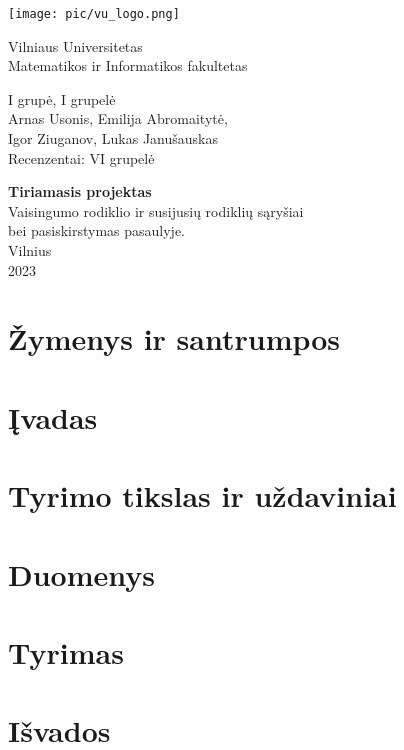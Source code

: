 \documentclass[12pt]{article}
\begin{document}
\begin{titlepage}
    \centering
    \texttt{[image: pic/vu\_logo.png]} \\
    {\Huge
    Vilniaus Universitetas \\
    Matematikos ir Informatikos fakultetas\par} 
    \vspace{2cm}
    
    \Large
    {I grupė, I grupelė \\
    Arnas Usonis, Emilija Abromaitytė, \\ Igor Ziuganov, Lukas Janušauskas \\
    Recenzentai: VI grupelė\par}
    \vspace{1cm}
    {\LARGE
    \textbf{Tiriamasis projektas \\}}
    \vspace{0.2cm}
    {\Large
    Vaisingumo rodiklio ir susijusių rodiklių sąryšiai \\ bei pasiskirstymas pasaulyje. \\}
    \vspace*{\fill}
    Vilnius \\ 2023
    
    
\end{titlepage}
\pagebreak

\normalsize
\tableofcontents
\pagebreak

\section{Žymenys ir santrumpos}


\section{Įvadas}

\pagebreak

\section{Tyrimo tikslas ir uždaviniai}

\pagebreak

\section{Duomenys}

\pagebreak

\section{Tyrimas}

\pagebreak

\section{Išvados}

\end{document}
